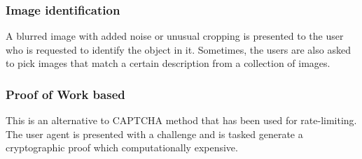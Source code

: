 \subsubsection{Image identification}
A blurred image with added noise or unusual cropping is presented to the user
who is requested to identify the object in it. Sometimes, the users are also
asked to pick images that match a certain description from a collection of
images.

\subsubsection{Proof of Work based}
This is an alternative to CAPTCHA method that has been used for rate-limiting.
The user agent is presented with a challenge and is tasked generate a
cryptographic proof which computationally expensive.

